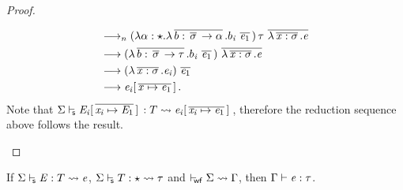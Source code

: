 \begin{proof}
\begin{description}
\begin{align*}
            & \longrightarrow_n   (  \lambda  \alpha  :  \star  .  \lambda  \,\overline{  b  :  \,\overline{  \sigma  }\,  \rightarrow  \alpha  }\,  .  b_{\mathit{i}} \, \,\overline{  \mathit{e_{{\mathrm{1}}}}  }\,  ) \, \tau \, \,\overline{  \lambda  \,\overline{  \mathit{x}  :  \sigma  }\,  .  \mathit{e}  }\, \\
            & \longrightarrow   (  \lambda  \,\overline{  b  :  \,\overline{  \sigma  }\,  \rightarrow  \tau  }\,  .  b_{\mathit{i}} \, \,\overline{  \mathit{e_{{\mathrm{1}}}}  }\,  ) \, \,\overline{  \lambda  \,\overline{  \mathit{x}  :  \sigma  }\,  .  \mathit{e}  }\,
\\
            & \longrightarrow   (  \lambda  \,\overline{  \mathit{x}  :  \sigma  }\,  .  \mathit{e_{\mathit{i}}}  ) \, \,\overline{  \mathit{e_{{\mathrm{1}}}}  }\, \\
            & \longrightarrow   \mathit{e_{\mathit{i}}}  [  \,\overline{  \mathit{x}  \mapsto  \mathit{e_{{\mathrm{1}}}}  }\,  ] \,.
        \end{align*}
        Note that $ \Sigma  \vdash_{\!\!\mathsf{s} }  \mathit{E_{\mathit{i}}}  [  \,\overline{  \mathit{x_{\mathit{i}}}  \mapsto  \mathit{E_{{\mathrm{1}}}}  }\,  ] \,  :  T   \rightsquigarrow   \mathit{e_{\mathit{i}}}  [  \,\overline{  \mathit{x_{\mathit{i}}}  \mapsto  \mathit{e_{{\mathrm{1}}}}  }\,  ] \, $, therefore the reduction sequence above follows the result.
    \end{description}
\end{proof}

\begin{thm}
If $ \Sigma  \vdash_{\!\!\mathsf{s} }  \mathit{E}  :  T   \rightsquigarrow   \mathit{e} $, $ \Sigma  \vdash_{\!\!\mathsf{s} }  T  :  \star   \rightsquigarrow   \tau $ and $ \vdash_{\!\!\mathsf{wf} }  \Sigma   \rightsquigarrow   \Gamma $, then
$\Gamma  \vdash  \mathit{e}  :  \tau$.
\end{thm}

